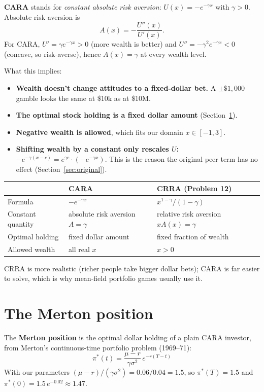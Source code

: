 \documentclass[11pt]{article}
\begin{document}
\textbf{CARA} stands for \emph{constant absolute risk aversion}: $U(x)=-e^{-\gamma x}$ with
$\gamma>0$. Absolute risk aversion is
\[
  A(x) = -\frac{U''(x)}{U'(x)} .
\]
For CARA, $U'=\gamma e^{-\gamma x}>0$ (more wealth is better) and
$U''=-\gamma^2e^{-\gamma x}<0$ (concave, so risk-averse), hence $A(x)=\gamma$ at every
wealth level.

What this implies:
\begin{itemize}
  \item \textbf{Wealth doesn't change attitudes to a fixed-dollar bet.} A $\pm\$1{,}000$
        gamble looks the same at \$10k as at \$10M.
  \item \textbf{The optimal stock holding is a fixed dollar amount} (Section~\ref{sec:merton}).
  \item \textbf{Negative wealth is allowed}, which fits our domain $x\in[-1,3]$.
  \item \textbf{Shifting wealth by a constant only rescales $U$:}
        $-e^{-\gamma(x-c)} = e^{\gamma c}\cdot(-e^{-\gamma x})$. This is the reason the
        original peer term has no effect (Section~\ref{sec:original}).
\end{itemize}

\begin{center}
\begin{tabular}{@{}lll@{}}
\toprule
 & CARA & CRRA (Problem 12) \\
\midrule
Formula & $-e^{-\gamma x}$ & $x^{1-\gamma}/(1-\gamma)$ \\
Constant quantity & absolute risk aversion $A=\gamma$ & relative risk aversion $xA(x)=\gamma$ \\
Optimal holding & fixed dollar amount & fixed fraction of wealth \\
Allowed wealth & all real $x$ & $x>0$ \\
\bottomrule
\end{tabular}
\end{center}
CRRA is more realistic (richer people take bigger dollar bets); CARA is far easier to
solve, which is why mean-field portfolio games usually use it.

\section{The Merton position}\label{sec:merton}

The \textbf{Merton position} is the optimal dollar holding of a plain CARA investor, from
Merton's continuous-time portfolio problem (1969--71):
\[
  \boxed{\;\pi^*(t) = \frac{\mu-r}{\gamma\sigma^2}\,e^{-r(T-t)}\;}
\]
With our parameters $(\mu-r)/(\gamma\sigma^2) = 0.06/0.04 = 1.5$, so $\pi^*(T)=1.5$ and
$\pi^*(0)=1.5\,e^{-0.02}\approx1.47$.
\end{document}
